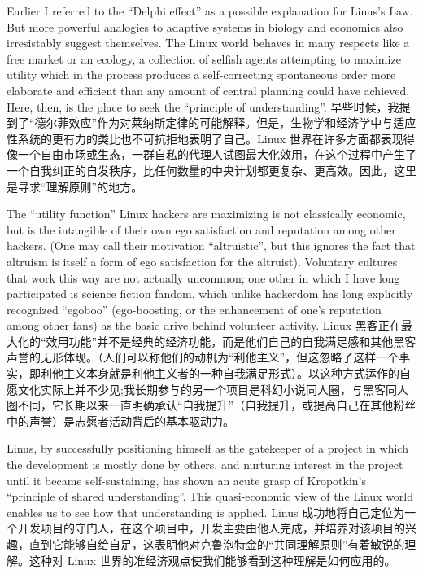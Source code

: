 \documentclass[a4paper,12pt,UTF8,twoside]{ctexbook}
\begin{document}
Earlier I referred to the ``Delphi effect'' as a possible explanation for Linus's Law. But more powerful analogies to adaptive systems in biology and economics also irresistably suggest themselves. The Linux world behaves in many respects like a free market or an ecology, a collection of selfish agents attempting to maximize utility which in the process produces a self-correcting spontaneous order more elaborate and efficient than any amount of central planning could have achieved. Here, then, is the place to seek the ``principle of understanding''.
早些时候，我提到了“德尔菲效应”作为对莱纳斯定律的可能解释。但是，生物学和经济学中与适应性系统的更有力的类比也不可抗拒地表明了自己。Linux 世界在许多方面都表现得像一个自由市场或生态，一群自私的代理人试图最大化效用，在这个过程中产生了一个自我纠正的自发秩序，比任何数量的中央计划都更复杂、更高效。因此，这里是寻求“理解原则”的地方。

The ``utility function'' Linux hackers are maximizing is not classically economic, but is the intangible of their own ego satisfaction and reputation among other hackers. (One may call their motivation ``altruistic'', but this ignores the fact that altruism is itself a form of ego satisfaction for the altruist). Voluntary cultures that work this way are not actually uncommon; one other in which I have long participated is science fiction fandom, which unlike hackerdom has long explicitly recognized ``egoboo'' (ego-boosting, or the enhancement of one's reputation among other fans) as the basic drive behind volunteer activity.
Linux 黑客正在最大化的“效用功能”并不是经典的经济功能，而是他们自己的自我满足感和其他黑客声誉的无形体现。（人们可以称他们的动机为“利他主义”，但这忽略了这样一个事实，即利他主义本身就是利他主义者的一种自我满足形式）。以这种方式运作的自愿文化实际上并不少见;我长期参与的另一个项目是科幻小说同人圈，与黑客同人圈不同，它长期以来一直明确承认“自我提升”（自我提升，或提高自己在其他粉丝中的声誉）是志愿者活动背后的基本驱动力。

Linus, by successfully positioning himself as the gatekeeper of a project in which the development is mostly done by others, and nurturing interest in the project until it became self-sustaining, has shown an acute grasp of Kropotkin's ``principle of shared understanding''. This quasi-economic view of the Linux world enables us to see how that understanding is applied.
Linus 成功地将自己定位为一个开发项目的守门人，在这个项目中，开发主要由他人完成，并培养对该项目的兴趣，直到它能够自给自足，这表明他对克鲁泡特金的“共同理解原则”有着敏锐的理解。这种对 Linux 世界的准经济观点使我们能够看到这种理解是如何应用的。
\end{document}
